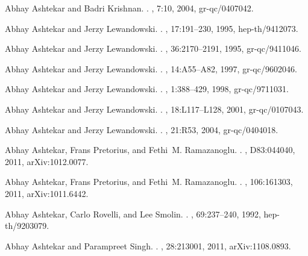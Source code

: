 \documentclass[aps, nofootinbib,superscriptaddress,12pt]{revtex4-2}
\begin{document}
\begin{thebibliography}{100}
Abhay Ashtekar and Badri Krishnan.
.
, 7:10, 2004, gr-qc/0407042.

Abhay Ashtekar and Jerzy Lewandowski.
.
, 17:191--230, 1995, hep-th/9412073.

Abhay Ashtekar and Jerzy Lewandowski.
.
, 36:2170--2191, 1995, gr-qc/9411046.

Abhay Ashtekar and Jerzy Lewandowski.
.
, 14:A55--A82, 1997, gr-qc/9602046.

Abhay Ashtekar and Jerzy Lewandowski.
.
, 1:388--429, 1998, gr-qc/9711031.

Abhay Ashtekar and Jerzy Lewandowski.
.
, 18:L117--L128, 2001, gr-qc/0107043.

Abhay Ashtekar and Jerzy Lewandowski.
.
, 21:R53, 2004, gr-qc/0404018.

Abhay Ashtekar, Frans Pretorius, and Fethi~M. Ramazanoglu.
.
, D83:044040, 2011, arXiv:1012.0077.

Abhay Ashtekar, Frans Pretorius, and Fethi~M. Ramazanoglu.
.
, 106:161303, 2011, arXiv:1011.6442.

Abhay Ashtekar, Carlo Rovelli, and Lee Smolin.
.
, 69:237--240, 1992, hep-th/9203079.

Abhay Ashtekar and Parampreet Singh.
.
, 28:213001, 2011, arXiv:1108.0893.


\end{thebibliography}
\end{document}
